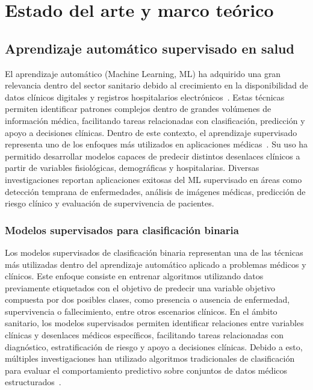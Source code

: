 \section{Estado del arte y marco teórico}\label{sec:estado-arte}

\subsection{Aprendizaje automático supervisado en salud}

El aprendizaje automático (Machine Learning, ML) ha adquirido una gran relevancia dentro del sector sanitario debido al crecimiento en la disponibilidad de datos clínicos digitales y registros hospitalarios electrónicos~\citep{bajwa2021,davenport2019}. Estas técnicas permiten identificar patrones complejos dentro de grandes volúmenes de información médica, facilitando tareas relacionadas con clasificación, predicción y apoyo a decisiones clínicas.
Dentro de este contexto, el aprendizaje supervisado representa uno de los enfoques más utilizados en aplicaciones médicas~\citep{shamout2021,delpino2025}. Su uso ha permitido desarrollar modelos capaces de predecir distintos desenlaces clínicos a partir de variables fisiológicas, demográficas y hospitalarias. Diversas investigaciones reportan aplicaciones exitosas del ML supervisado en áreas como detección temprana de enfermedades, análisis de imágenes médicas, predicción de riesgo clínico y evaluación de supervivencia de pacientes.

\subsubsection{Modelos supervisados para clasificación binaria}

Los modelos supervisados de clasificación binaria representan una de las técnicas más utilizadas dentro del aprendizaje automático aplicado a problemas médicos y clínicos. Este enfoque consiste en entrenar algoritmos utilizando datos previamente etiquetados con el objetivo de predecir una variable objetivo compuesta por dos posibles clases, como presencia o ausencia de enfermedad, supervivencia o fallecimiento, entre otros escenarios clínicos.
En el ámbito sanitario, los modelos supervisados permiten identificar relaciones entre variables clínicas y desenlaces médicos específicos, facilitando tareas relacionadas con diagnóstico, estratificación de riesgo y apoyo a decisiones clínicas. Debido a esto, múltiples investigaciones han utilizado algoritmos tradicionales de clasificación para evaluar el comportamiento predictivo sobre conjuntos de datos médicos estructurados~\citep{james2021,sklearn_supervised}.

